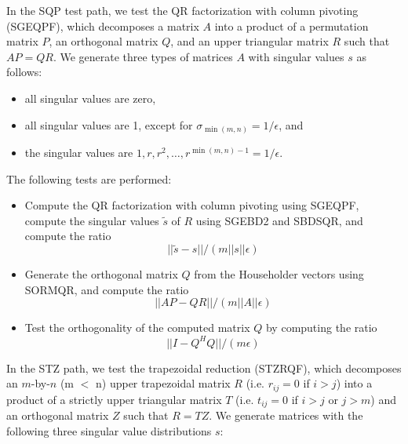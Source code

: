 \begin{sloppypar}
In the SQP test path, we test the QR factorization with
column pivoting (SGEQPF), which decomposes a matrix $A$ into a product
of a permutation matrix $P$, an orthogonal matrix $Q$, and an upper
triangular matrix $R$ such that $AP = QR$. We generate three types of
matrices $A$ with singular
values $s$ as follows:
\end{sloppypar}
\begin{itemize}
\item all singular values are zero,
\item all singular values are 1, except for $\sigma_{\min(m,n)} =
1/\epsilon$, and
\item the singular values are $1, r, r^2, \ldots, r^{\min(m,n)-1} =
1/\epsilon$.
\end{itemize}
The following tests are performed:
\begin{itemize}
\item Compute the QR factorization with column pivoting using SGEQPF,
compute
the singular values $\tilde{s}$ of $R$ using SGEBD2 and SBDSQR, and
compute the
ratio
        $$||\tilde{s} - s||/(m||s||\epsilon)$$
\item Generate the orthogonal matrix $Q$ from the Householder vectors
using
        SORMQR, and compute the ratio
        $$|| AP - QR ||/(m||A||\epsilon)$$
\item Test the orthogonality of the computed matrix $Q$ by computing the
ratio
        $$ || I - Q^H Q ||/(m \epsilon)$$
\end{itemize}

\begin{sloppypar}
In the STZ path, we test the trapezoidal reduction (STZRQF), which
decomposes
an $m$-by-$n$ (m $<$ n) upper trapezoidal matrix $R$
(i.e. $r_{ij} = 0$ if $i > j$) into a product
of a strictly upper triangular matrix $T$ (i.e. $t_{ij} = 0$ if
$i > j$ or $j > m$) and an orthogonal matrix $Z$ such that $R = TZ$.
We generate matrices with the following three singular value
distributions $s$:
\end{sloppypar}

